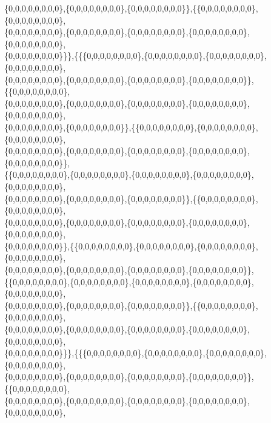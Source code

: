 \documentclass[a4paper,11pt]{jbook}
\theoremstyle{plain}
\theoremstyle{definition}
\theoremstyle{remark}
\theoremstyle{proof}
\numberwithin{equation}{section}
\begin{document}
\begin{doublespace}
\{0,0,0,0,0,0,0,0\},\{0,0,0,0,0,0,0,0\},\{0,0,0,0,0,0,0,0\}\},\{\{0,0,0,0,0,0,0,0\},\{0,0,0,0,0,0,0,0\}, \\
\{0,0,0,0,0,0,0,0\},\{0,0,0,0,0,0,0,0\},\{0,0,0,0,0,0,0,0\},\{0,0,0,0,0,0,0,0\},\{0,0,0,0,0,0,0,0\},\\
\{0,0,0,0,0,0,0,0\}\}\},\{\{\{0,0,0,0,0,0,0,0\},\{0,0,0,0,0,0,0,0\},\{0,0,0,0,0,0,0,0\},\{0,0,0,0,0,0,0,0\}, \\
\{0,0,0,0,0,0,0,0\},\{0,0,0,0,0,0,0,0\},\{0,0,0,0,0,0,0,0\},\{0,0,0,0,0,0,0,0\}\},\{\{0,0,0,0,0,0,0,0\}, \\
\{0,0,0,0,0,0,0,0\},\{0,0,0,0,0,0,0,0\},\{0,0,0,0,0,0,0,0\},\{0,0,0,0,0,0,0,0\},\{0,0,0,0,0,0,0,0\},\\
\{0,0,0,0,0,0,0,0\},\{0,0,0,0,0,0,0,0\}\},\{\{0,0,0,0,0,0,0,0\},\{0,0,0,0,0,0,0,0\},\{0,0,0,0,0,0,0,0\}, \\
\{0,0,0,0,0,0,0,0\},\{0,0,0,0,0,0,0,0\},\{0,0,0,0,0,0,0,0\},\{0,0,0,0,0,0,0,0\},\{0,0,0,0,0,0,0,0\}\},\\
\{\{0,0,0,0,0,0,0,0\},\{0,0,0,0,0,0,0,0\},\{0,0,0,0,0,0,0,0\},\{0,0,0,0,0,0,0,0\},\{0,0,0,0,0,0,0,0\}, \\
\{0,0,0,0,0,0,0,0\},\{0,0,0,0,0,0,0,0\},\{0,0,0,0,0,0,0,0\}\},\{\{0,0,0,0,0,0,0,0\},\{0,0,0,0,0,0,0,0\}, \\
\{0,0,0,0,0,0,0,0\},\{0,0,0,0,0,0,0,0\},\{0,0,0,0,0,0,0,0\},\{0,0,0,0,0,0,0,0\},\{0,0,0,0,0,0,0,0\},\\
\{0,0,0,0,0,0,0,0\}\},\{\{0,0,0,0,0,0,0,0\},\{0,0,0,0,0,0,0,0\},\{0,0,0,0,0,0,0,0\},\{0,0,0,0,0,0,0,0\}, \\
\{0,0,0,0,0,0,0,0\},\{0,0,0,0,0,0,0,0\},\{0,0,0,0,0,0,0,0\},\{0,0,0,0,0,0,0,0\}\}, \\
\{\{0,0,0,0,0,0,0,0\},\{0,0,0,0,0,0,0,0\},\{0,0,0,0,0,0,0,0\},\{0,0,0,0,0,0,0,0\},\{0,0,0,0,0,0,0,0\}, \\
\{0,0,0,0,0,0,0,0\},\{0,0,0,0,0,0,0,0\},\{0,0,0,0,0,0,0,0\}\},\{\{0,0,0,0,0,0,0,0\},\{0,0,0,0,0,0,0,0\}, \\
\{0,0,0,0,0,0,0,0\},\{0,0,0,0,0,0,0,0\},\{0,0,0,0,0,0,0,0\},\{0,0,0,0,0,0,0,0\},\{0,0,0,0,0,0,0,0\},\\
\{0,0,0,0,0,0,0,0\}\}\},\{\{\{0,0,0,0,0,0,0,0\},\{0,0,0,0,0,0,0,0\},\{0,0,0,0,0,0,0,0\},\{0,0,0,0,0,0,0,0\}, \\
\{0,0,0,0,0,0,0,0\},\{0,0,0,0,0,0,0,0\},\{0,0,0,0,0,0,0,0\},\{0,0,0,0,0,0,0,0\}\},\{\{0,0,0,0,0,0,0,0\}, \\
\{0,0,0,0,0,0,0,0\},\{0,0,0,0,0,0,0,0\},\{0,0,0,0,0,0,0,0\},\{0,0,0,0,0,0,0,0\},\{0,0,0,0,0,0,0,0\},\\

\end{doublespace}
\end{document}
